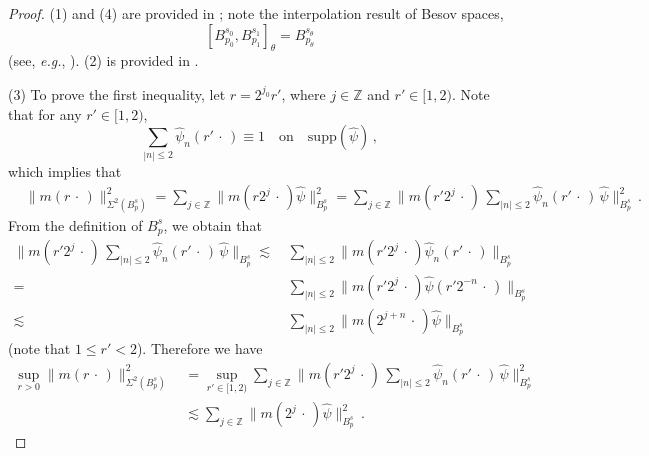 \documentclass[11pt]{amsart}
\theoremstyle{plain}
\theoremstyle{definition}
\theoremstyle{remark}
\numberwithin{equation}{section}
\newcommand{\Z}{\mathbb{Z}}
\newcommand{\bZ}{\mathbb{Z}}
\newcommand{\wh}{\widehat}
\begin{document}
\begin{proof}
(1) and (4) are provided in \cite[Subsection 1.2]{LeeSeo_2023}; note the interpolation result of Besov spaces,
$$
    [B_{p_0}^{s_0}, B_{p_1}^{s_1}]_\theta = B_{p_\theta}^{s_\theta}
$$
(see, \textit{e.g.}, \cite[Theorem~6.4.5, (6)]{BerLof1976}).
(2) is provided in \cite[Proposition 2.2]{Lo1}.

    (3) To prove the first inequality, let $r=2^{j_0}r'$, where $j\in\bZ$ and $r'\in[1,2)$.
    Note that for any $r'\in[1,2)$,
    $$
    \sum_{|n|\leq 2}\wh{\psi}_{n}(r'\,\cdot\,)\equiv 1\quad \text{on}\quad \mathrm{supp}(\wh{\psi})\,,
    $$
    which implies that
    \begin{align*}
        &\|m(r\,\cdot\,)\|_{\Sigma^2(B_p^s)}^2=\sum_{j\in\Z} \big\| m(r2^j \,\cdot\,) \wh{\psi} \big\|_{B_p^s}^2=\sum_{j\in\Z}\bigg\| m(r'2^j \,\cdot\,) \,\sum_{|n|\leq 2}\wh{\psi}_{n}(r'\,\cdot\,)\,\wh{\psi}\bigg\|_{B_p^s}^2\,.
    \end{align*}
From the definition of $B^s_p$, we obtain that
\begin{align*}
\bigg\| m(r'2^j \,\cdot\,) \,\sum_{|n|\leq 2}\wh{\psi}_{n}(r'\,\cdot\,)\,\wh{\psi}\bigg\|_{B_p^s}\lesssim\,& \sum_{|n|\leq 2}\big\| m(r'2^j \,\cdot\,)\wh{\psi}_{n}(r'\,\cdot\,)\big\|_{B_p^s}\\
=\,&\sum_{|n|\leq 2}\big\| m(r'2^{j} \,\cdot\,)\wh{\psi}(r'2^{-n}\,\cdot\,)\big\|_{B_p^s}\\
\lesssim\,&\sum_{|n|\leq 2} \big\| m(2^{j+n} \,\cdot\,)\wh{\psi}\big\|_{B_p^s}
\end{align*}
(note that $1\leq r'<2$).
Therefore we have
\begin{align*}
\sup_{r>0}\|m(r\,\cdot\,)\|_{\Sigma^2(B_p^s)}^2\,&=\sup_{r'\in[1,2)}\sum_{j\in\Z}\bigg\| m(r'2^j \,\cdot\,) \,\sum_{|n|\leq 2}\wh{\psi}_{n}(r'\,\cdot\,)\,\wh{\psi}\bigg\|_{B_p^s}^2\\
&\lesssim \sum_{j\in\bZ}\big\| m(2^j \,\cdot\,)\wh{\psi}\big\|_{B_p^s}^2\,.
\end{align*}


\end{proof}
\end{document}
